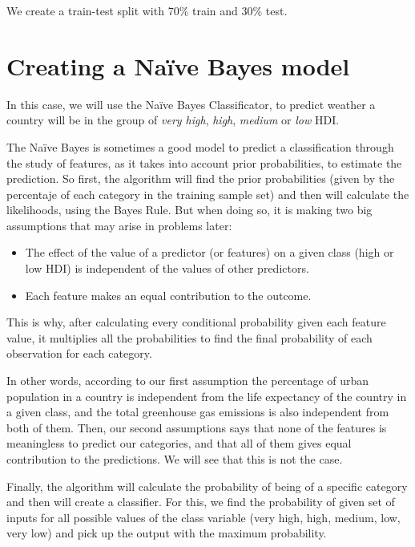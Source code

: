 \documentclass[]{article}
\providecommand{\tightlist}{%
  \setlength{\itemsep}{0pt}\setlength{\parskip}{0pt}}
\begin{document}
We create a train-test split with 70\% train and 30\% test.

\newpage

\hypertarget{creating-a-nauxefve-bayes-model}{%
\section{Creating a Naïve Bayes
model}\label{creating-a-nauxefve-bayes-model}}

In this case, we will use the Naïve Bayes Classificator, to predict
weather a country will be in the group of \emph{very high}, \emph{high},
\emph{medium} or \emph{low} HDI.

The Naïve Bayes is sometimes a good model to predict a classification
through the study of features, as it takes into account prior
probabilities, to estimate the prediction. So first, the algorithm will
find the prior probabilities (given by the percentaje of each category
in the training sample set) and then will calculate the likelihoods,
using the Bayes Rule. But when doing so, it is making two big
assumptions that may arise in problems later:

\begin{itemize}
\tightlist
\item
  The effect of the value of a predictor (or features) on a given class
  (high or low HDI) is independent of the values of other predictors.
\item
  Each feature makes an equal contribution to the outcome.
\end{itemize}

This is why, after calculating every conditional probability given each
feature value, it multiplies all the probabilities to find the final
probability of each observation for each category.

In other words, according to our first assumption the percentage of
urban population in a country is independent from the life expectancy of
the country in a given class, and the total greenhouse gas emissions is
also independent from both of them. Then, our second assumptions says
that none of the features is meaningless to predict our categories, and
that all of them gives equal contribution to the predictions. We will
see that this is not the case.

Finally, the algorithm will calculate the probability of being of a
specific category and then will create a classifier. For this, we find
the probability of given set of inputs for all possible values of the
class variable (very high, high, medium, low, very low) and pick up the
output with the maximum probability.
\end{document}
